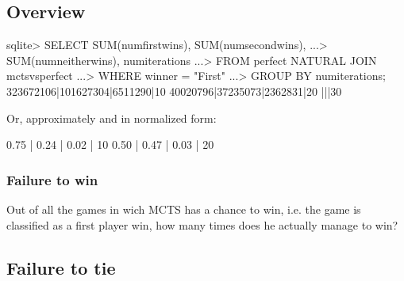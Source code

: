 \subsection{Overview}

\begin{code}
sqlite> SELECT SUM(numfirstwins), SUM(numsecondwins),
   ...>        SUM(numneitherwins), numiterations
   ...> FROM perfect NATURAL JOIN mctsvsperfect
   ...> WHERE winner = "First"
   ...> GROUP BY numiterations;
323672106|101627304|6511290|10
40020796|37235073|2362831|20
|||30
\end{code}

Or, approximately and in normalized form:

\begin{code}
0.75 | 0.24 | 0.02 | 10
0.50 | 0.47 | 0.03 | 20
\end{code}

\subsubsection{Failure to win}

Out of all the games in wich MCTS has a chance to win, i.e. the game is classified as a first player win, how many times does he actually manage to win?



\subsection{Failure to tie}
